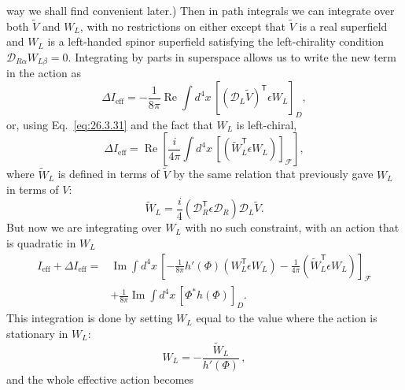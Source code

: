 way we shall find convenient later.) Then in path integrals we can integrate
over both \(\widetilde V\) and \(W_L\), with no restrictions on either except
that \(\widetilde V\) is a real superfield and \(W_L\) is a left-handed
spinor superfield satisfying the left-chirality condition
\(\mathcal{D}_{R\alpha}W_{L\beta}=0\). Integrating by parts in superspace
allows us to write the new term in the action as
\begin{equation}
  \Delta I_{\mathrm{eff}}
  =-\frac{1}{8\pi}\operatorname{Re}\int d^4x\,
    \left[
      \left(\mathcal{D}_L\widetilde V\right)^{\mathsf T}
      \epsilon W_L
    \right]_D,
  \tag{29.5.26}\label{eq:29.5.26}
\end{equation}
or, using Eq.~\eqref{eq:26.3.31} and the fact that \(W_L\) is left-chiral,
\begin{equation}
  \Delta I_{\mathrm{eff}}
  =\operatorname{Re}\left[
    \frac{i}{4\pi}\int d^4x\,
    \left[
      \left(\widetilde W_L^{\mathsf T}\epsilon W_L\right)
    \right]_{\mathcal F}
  \right],
  \tag{29.5.27}\label{eq:29.5.27}
\end{equation}
where \(\widetilde W_L\) is defined in terms of \(\widetilde V\) by the same
relation that previously gave \(W_L\) in terms of \(V\):
\begin{equation}
  \widetilde W_L
  =\frac{i}{4}
    \left(\mathcal{D}_R^{\mathsf T}\epsilon\mathcal{D}_R\right)
    \mathcal{D}_L\widetilde V.
  \tag{29.5.28}\label{eq:29.5.28}
\end{equation}
But now we are integrating over \(W_L\) with no such constraint, with an
action that is quadratic in \(W_L\)
\begin{equation}
  \begin{aligned}
  I_{\mathrm{eff}}+\Delta I_{\mathrm{eff}}
  ={}&\operatorname{Im}\int d^4x\,
  \left[
    -\frac{1}{8\pi}h'(\Phi)
      \left(W_L^{\mathsf T}\epsilon W_L\right)
    -\frac{1}{4\pi}
      \left(\widetilde W_L^{\mathsf T}\epsilon W_L\right)
  \right]_{\mathcal F}
  \\
  &+\frac{1}{8\pi}\operatorname{Im}\int d^4x\,
    \left[\Phi^*h(\Phi)\right]_D.
  \end{aligned}
  \tag{29.5.29}\label{eq:29.5.29}
\end{equation}
This integration is done by setting \(W_L\) equal to the value where the
action is stationary in \(W_L\):
\begin{equation}
  W_L=-\frac{\widetilde W_L}{h'(\Phi)}\,,
  \tag{29.5.30}\label{eq:29.5.30}
\end{equation}
and the whole effective action becomes

